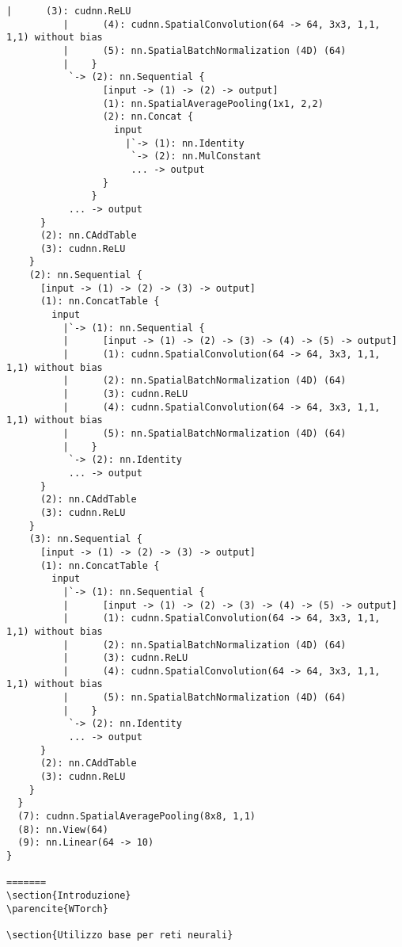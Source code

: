 \begin{lstlisting}[language={[5.2]Lua}]
          |      (3): cudnn.ReLU
          |      (4): cudnn.SpatialConvolution(64 -> 64, 3x3, 1,1, 1,1) without bias
          |      (5): nn.SpatialBatchNormalization (4D) (64)
          |    }
           `-> (2): nn.Sequential {
                 [input -> (1) -> (2) -> output]
                 (1): nn.SpatialAveragePooling(1x1, 2,2)
                 (2): nn.Concat {
                   input
                     |`-> (1): nn.Identity
                      `-> (2): nn.MulConstant
                      ... -> output
                 }
               }
           ... -> output
      }
      (2): nn.CAddTable
      (3): cudnn.ReLU
    }
    (2): nn.Sequential {
      [input -> (1) -> (2) -> (3) -> output]
      (1): nn.ConcatTable {
        input
          |`-> (1): nn.Sequential {
          |      [input -> (1) -> (2) -> (3) -> (4) -> (5) -> output]
          |      (1): cudnn.SpatialConvolution(64 -> 64, 3x3, 1,1, 1,1) without bias
          |      (2): nn.SpatialBatchNormalization (4D) (64)
          |      (3): cudnn.ReLU
          |      (4): cudnn.SpatialConvolution(64 -> 64, 3x3, 1,1, 1,1) without bias
          |      (5): nn.SpatialBatchNormalization (4D) (64)
          |    }
           `-> (2): nn.Identity
           ... -> output
      }
      (2): nn.CAddTable
      (3): cudnn.ReLU
    }
    (3): nn.Sequential {
      [input -> (1) -> (2) -> (3) -> output]
      (1): nn.ConcatTable {
        input
          |`-> (1): nn.Sequential {
          |      [input -> (1) -> (2) -> (3) -> (4) -> (5) -> output]
          |      (1): cudnn.SpatialConvolution(64 -> 64, 3x3, 1,1, 1,1) without bias
          |      (2): nn.SpatialBatchNormalization (4D) (64)
          |      (3): cudnn.ReLU
          |      (4): cudnn.SpatialConvolution(64 -> 64, 3x3, 1,1, 1,1) without bias
          |      (5): nn.SpatialBatchNormalization (4D) (64)
          |    }
           `-> (2): nn.Identity
           ... -> output
      }
      (2): nn.CAddTable
      (3): cudnn.ReLU
    }
  }
  (7): cudnn.SpatialAveragePooling(8x8, 1,1)
  (8): nn.View(64)
  (9): nn.Linear(64 -> 10)
}

=======
\section{Introduzione}
\parencite{WTorch}

\section{Utilizzo base per reti neurali}


\end{lstlisting}
